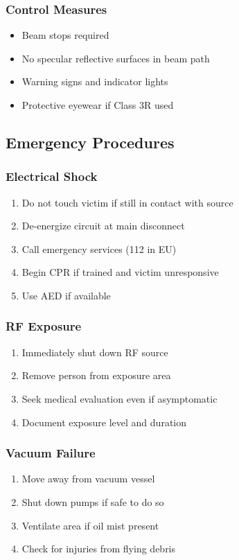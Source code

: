 \subsubsection{Control Measures}
\begin{itemize}[noitemsep]
    \item Beam stops required
    \item No specular reflective surfaces in beam path
    \item Warning signs and indicator lights
    \item Protective eyewear if Class 3R used
\end{itemize}

\subsection{Emergency Procedures}

\subsubsection{Electrical Shock}
\begin{enumerate}[noitemsep]
    \item Do not touch victim if still in contact with source
    \item De-energize circuit at main disconnect
    \item Call emergency services (112 in EU)
    \item Begin CPR if trained and victim unresponsive
    \item Use AED if available
\end{enumerate}

\subsubsection{RF Exposure}
\begin{enumerate}[noitemsep]
    \item Immediately shut down RF source
    \item Remove person from exposure area
    \item Seek medical evaluation even if asymptomatic
    \item Document exposure level and duration
\end{enumerate}

\subsubsection{Vacuum Failure}
\begin{enumerate}[noitemsep]
    \item Move away from vacuum vessel
    \item Shut down pumps if safe to do so
    \item Ventilate area if oil mist present
    \item Check for injuries from flying debris
\end{enumerate}

